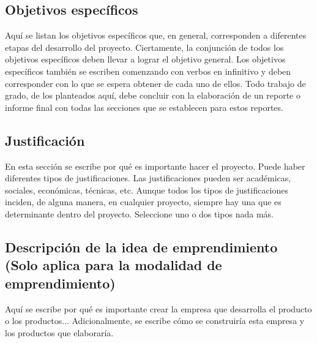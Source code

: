 \documentclass{article}
\begin{document}
\subsection*{Objetivos específicos}
\noindent Aquí se listan los objetivos específicos que, en general, corresponden a diferentes etapas del desarrollo del proyecto. Ciertamente, la conjunción de todos los objetivos específicos deben llevar a lograr el objetivo general. Los objetivos específicos también se escriben comenzando con verbos en infinitivo y deben corresponder con lo que se espera obtener de cada uno de ellos. Todo trabajo de grado, de los planteados aquí, debe concluir con la elaboración de un reporte o informe final con todas las secciones que se establecen para estos reportes. %

\subsection*{Justificación}
\noindent En esta sección se escribe por qué es importante hacer el proyecto. Puede haber diferentes tipos de justificaciones. Las justificaciones pueden ser académicas, sociales, económicas, técnicas, etc. Aunque todos los tipos de justificaciones inciden, de alguna manera, en cualquier proyecto, siempre hay una que es determinante dentro del proyecto. Seleccione uno o dos tipos nada más. %

\subsection*{Descripción de la idea de emprendimiento \\ {\scriptsize(Solo aplica para la modalidad de emprendimiento)}}
\noindent Aquí se escribe por qué es importante crear la empresa que desarrolla el producto o los productos... Adicionalmente, se escribe cómo se construiría esta empresa y los productos que elaboraría. 
\end{document}
